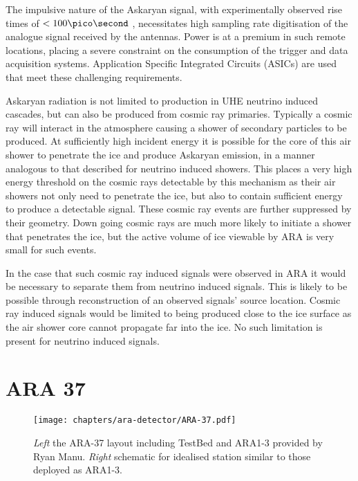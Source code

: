 The impulsive nature of the Askaryan signal, with experimentally observed rise times of $< 100 \pico \second$ \cite{PhysRevLett.86.2802}, necessitates high sampling rate digitisation of the analogue signal received by the antennas. Power is at a premium in such remote locations, placing a severe constraint on the consumption of the trigger and data acquisition systems. Application Specific Integrated Circuits (ASICs) are used that meet these challenging requirements.

Askaryan radiation is not limited to production in UHE neutrino induced cascades, but can also be produced from cosmic ray primaries. Typically a cosmic ray will interact in the atmosphere causing a shower of secondary particles to be produced. At sufficiently high incident energy it is possible for the core of this air shower to penetrate the ice and produce Askaryan emission, in a manner analogous to that described for neutrino induced showers. This places a very high energy threshold on the cosmic rays detectable by this mechanism as their air showers not only need to penetrate the ice, but also to contain sufficient energy to produce a detectable signal. These cosmic ray events are further suppressed by their geometry. Down going cosmic rays are much more likely to initiate a shower that penetrates the ice, but the active volume of ice viewable by ARA is very small for such events. 

In the case that such cosmic ray induced signals were observed in ARA it would be necessary to separate them from neutrino induced signals. This is likely to be possible through reconstruction of an observed signals' source location. Cosmic ray induced signals would be limited to being produced close to the ice surface as the air shower core cannot propagate far into the ice. No such limitation is present for neutrino induced signals.


\section{ARA 37}
\label{sec:ara-detector:ARA37}

\begin{figure}[htpb]
  \centering
  \texttt{[image: chapters/ara-detector/ARA-37.pdf]}
  \caption{\textit{Left} the ARA-37 layout including TestBed and ARA1-3 provided by Ryan Manu. \textit{Right} schematic for idealised station similar to those deployed as ARA1-3.}
  \label{fig:ara-detector:ARA-37:ARA-37}
\end{figure}

